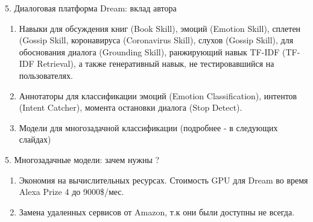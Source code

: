 \begin{frame}{5. Диалоговая платформа Dream: вклад автора}
\begin{enumerate}
 \item Навыки для обсуждения книг (Book Skill), эмоций (Emotion Skill), сплетен (Gossip Skill, коронавируса (Coronavirus Skill), слухов (Gossip Skill), для обоснования диалога (Grounding Skill), ранжирующий навык TF-IDF (TF-IDF Retrieval), а также генеративный навык, не тестировавшийся на пользователях.
 \item Аннотаторы для классификации эмоций (Emotion Classification), интентов (Intent Catcher), момента остановки диалога (Stop Detect).
 \item Модели для многозадачной классификации (подробнее - в следующих слайдах)
\end{enumerate}
\end{frame}
\begin{frame}{5. Многозадачные модели: зачем нужны ?}
\begin{enumerate}
\item Экономия на вычислительных ресурсах. Стоимость GPU для Dream во время Alexa Prize 4 до 9000\$/мес.
\item Замена удаленных сервисов от Amazon, т.к они были доступны не всегда.
\end{enumerate}
\end{frame}

